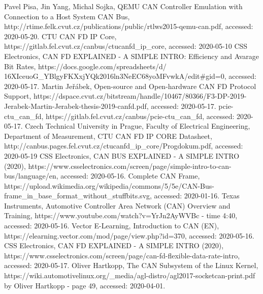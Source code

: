 \documentclass{ctuthesis}
\begin{document}
 
\renewcommand\bibname{References}
\begin{thebibliography}{1}
 Pavel Pisa, Jin Yang, Michal Sojka, QEMU CAN Controller Emulation with Connection to a Host
System CAN Bus, http://rtime.felk.cvut.cz/publications/public/rtlws2015-qemu-can.pdf, accessed: 2020-05-20.
 CTU CAN FD IP Core, https://gitlab.fel.cvut.cz/canbus/ctucanfd\_ip\_core, accessed: 2020-05-10
 CSS Electronics, CAN FD EXPLAINED - A SIMPLE INTRO: Efficiency and Avarage Bit Rates, https://docs.google.com/spreadsheets/d/\\16XIceuoG\_YBlgyFKXxjYQk2016ln3NeEC68yoMFvwkA/edit\#gid=0, accessed: 2020-05-17.
 Martin Jeřábek, Open-source and Open-hardware CAN FD Protocol Support, https://dspace.cvut.cz/bitstream/handle/10467/80366/F3-DP-2019-Jerabek-Martin-Jerabek-thesis-2019-canfd.pdf, accessed: 2020-05-17.
 pcie-ctu\_can\_fd, https://gitlab.fel.cvut.cz/canbus/pcie-ctu\_can\_fd, accessed: 2020-05-17.
 Czech Technical University in Prague, Faculty of Electrical Engineering, Department of Measurement, CTU CAN FD IP CORE Datasheet, http://canbus.pages.fel.cvut.cz/ctucanfd\_ip\_core/Progdokum.pdf, accessed: 2020-05-19
 CSS Electronics, CAN BUS EXPLAINED - A SIMPLE INTRO (2020), https://www.csselectronics.com/screen/page/simple-intro-to-can-bus/language/en, accessed: 2020-05-16.
 Complete CAN Frame, https://upload.wikimedia.org/wikipedia/commons/5/5e/CAN-Bus-frame\_in\_base\_format\_without\_stuffbits.svg, accessed: 2020-01-16.
 Texas Instruments, Automotive Controller Area Network (CAN) Overview and Training, https://www.youtube.com/watch?v=YrJn2AyWVBc - time 4:40, accessed: 2020-05-16.
 Vector E-Learning, Introduction to CAN (EN), https://elearning.vector.com/mod/page/view.php?id=370, accessed: 2020-05-16.
 CSS Electronics, CAN FD EXPLAINED - A SIMPLE INTRO (2020), https://www.csselectronics.com/screen/page/can-fd-flexible-data-rate-intro, accessed: 2020-05-17.
 Oliver Hartkopp, The CAN Subsystem of the Linux Kernel, https://wiki.automotivelinux.org/\_media/agl-distro/agl2017-socketcan-print.pdf by Oliver Hartkopp - page 49, accessed: 2020-04-01.


\end{thebibliography}
\end{document}
